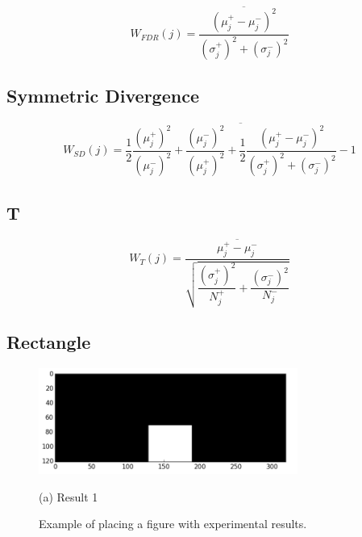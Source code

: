 \documentclass{article}
\begin{document}
\begin{equation} \label{FDR}
W_{FDR}(j) = \overline{\dfrac{( \mu^{+}_{j} - \mu^{-}_{j} )^{2}}{(\sigma^{+}_{j})^{2} + (\sigma^{-}_{j})^{2}}}
\end{equation}

\subsection{Symmetric Divergence}

\begin{equation} \label{SD}
W_{SD}(j) = \overline{\dfrac{1}{2} \dfrac{(\mu^{+}_{j})^{2}}{(\mu^{-}_{j})^{2}} + \dfrac{(\mu^{-}_{j})^{2}}{(\mu^{+}_{j})^{2}} + \dfrac{1}{2} \dfrac{( \mu^{+}_{j} - \mu^{-}_{j} )^{2}}{(\sigma^{+}_{j})^{2} + (\sigma^{-}_{j})^{2}} - 1}
\end{equation}

\subsection{T}

\begin{equation} \label{T}
W_{T}(j) = \overline{\dfrac{ \mu^{+}_{j} - \mu^{-}_{j}}{\sqrt{\dfrac{(\sigma^{+}_{j})^{2}}{N^{+}_{j}} + \dfrac{(\sigma^{-}_{j})^{2}}{N^{-}_{j}}}}}
\end{equation}

\subsection{Rectangle}

\begin{figure}[htb]

\begin{minipage}[b]{1.0\linewidth}
  \centering
  \centerline{\includegraphics[width=8.5cm]{rect}}
  \centerline{(a) Result 1}\medskip
\end{minipage}
%
\caption{Example of placing a figure with experimental results.}
\label{fig:res}
%
\end{figure}
\end{document}

